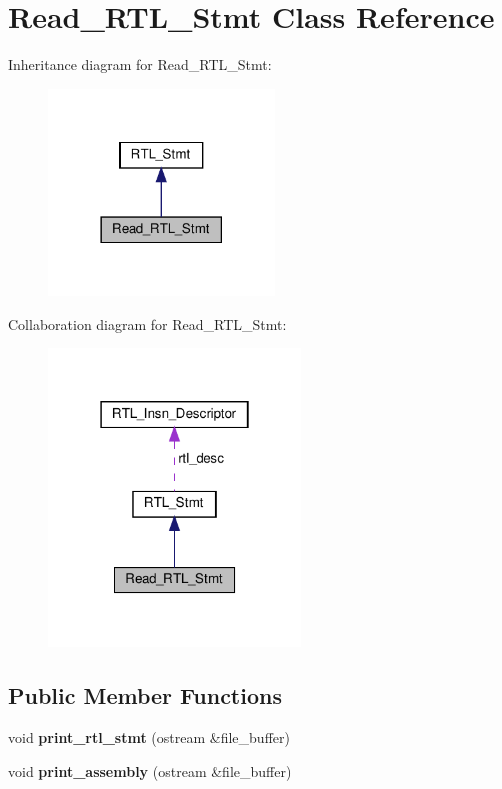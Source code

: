 \hypertarget{classRead__RTL__Stmt}{}\section{Read\+\_\+\+R\+T\+L\+\_\+\+Stmt Class Reference}
\label{classRead__RTL__Stmt}


Inheritance diagram for Read\+\_\+\+R\+T\+L\+\_\+\+Stmt\+:
\nopagebreak
\begin{figure}[H]
\begin{center}
\leavevmode
\includegraphics[width=170pt]{classRead__RTL__Stmt__inherit__graph}
\end{center}
\end{figure}


Collaboration diagram for Read\+\_\+\+R\+T\+L\+\_\+\+Stmt\+:
\nopagebreak
\begin{figure}[H]
\begin{center}
\leavevmode
\includegraphics[width=190pt]{classRead__RTL__Stmt__coll__graph}
\end{center}
\end{figure}
\subsection*{Public Member Functions}
\begin{DoxyCompactItemize}
\item 
\mbox{\label{classRead__RTL__Stmt_a02d855d4e53e8fc7afab748677bd7de0}} 
void {\bfseries print\+\_\+rtl\+\_\+stmt} (ostream \&file\+\_\+buffer)
\item 
\mbox{\label{classRead__RTL__Stmt_a1c144c83143e468d955dc0e88af01e28}} 
void {\bfseries print\+\_\+assembly} (ostream \&file\+\_\+buffer)
\end{DoxyCompactItemize}
